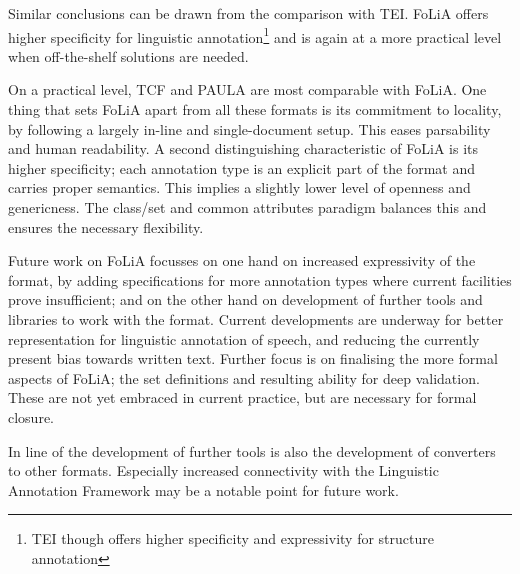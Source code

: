 \documentclass[a4paper,10pt,twoside]{article}
\begin{document}
Similar conclusions can be drawn from the comparison with TEI. FoLiA offers
higher specificity for linguistic annotation\footnote{TEI though offers higher
specificity and expressivity for structure annotation} and is again at a more
practical level when off-the-shelf solutions are needed.

On a practical level, TCF and PAULA are most comparable with FoLiA. One thing
that sets FoLiA apart from all these formats is its commitment to locality, by
following a largely in-line and single-document setup. This eases
parsability and human readability. A second distinguishing characteristic of
FoLiA is its higher specificity; each annotation type is an explicit part of
the format and carries proper semantics. This implies a slightly lower level of
openness and genericness. The class/set and common attributes paradigm balances
this and ensures the necessary flexibility.

Future work on FoLiA focusses on one hand on increased expressivity of the
format, by adding specifications for more annotation types where current
facilities prove insufficient; and on the other hand on development of further
tools and libraries to work with the format. Current developments are
underway for better representation for linguistic annotation of speech, and
reducing the currently present bias towards written text. Further focus is on
finalising the more formal aspects of FoLiA; the set definitions and resulting
ability for deep validation. These are not yet embraced in current practice,
but are necessary for formal closure.

In line of the development of further tools is also the development of
converters to other formats. Especially increased connectivity with the
Linguistic Annotation Framework may be a notable point for future work.

 
  
\end{document}
